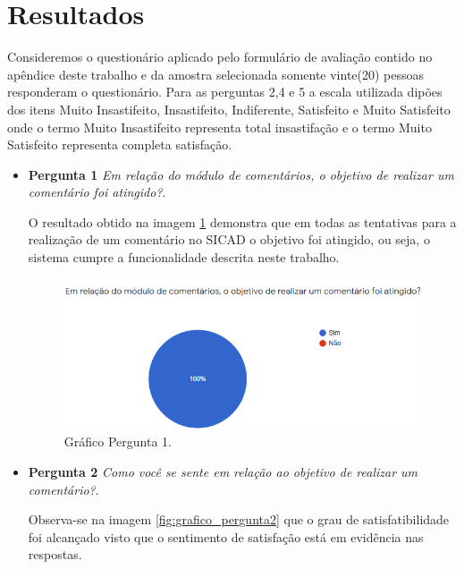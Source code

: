 \documentclass[12pt, a4paper]{report}
\begin{document}
\section{Resultados} 
Consideremos o questionário aplicado pelo formulário de avaliação contido no apêndice deste trabalho e da amostra selecionada somente vinte(20) pessoas responderam o questionário.
Para as perguntas 2,4 e 5 a escala utilizada dipões dos itens Muito Insastifeito, Insastifeito, Indiferente, Satisfeito e Muito Satisfeito onde o termo Muito Insastifeito representa total insastifação e o termo Muito Satisfeito representa completa satisfação.

\begin{itemize}
\item{\textbf{ Pergunta 1}}
\textit{Em relação do módulo de comentários, o objetivo de realizar um comentário foi atingido?}.

O resultado obtido na imagem \ref{fig:grafico_pergunta1} demonstra que em todas as tentativas para a realização de um comentário no SICAD o objetivo foi atingido, ou seja, o sistema cumpre a funcionalidade descrita neste trabalho.

\begin{figure}
\centering
\includegraphics[scale=0.8]{grafico_pergunta1.png}
\caption{Gráfico Pergunta 1.}
\label{fig:grafico_pergunta1}
\end{figure}

\item{\textbf{ Pergunta 2}}
\textit{Como você se sente em relação ao objetivo de realizar um comentário?}.


Observa-se na imagem \ref{fig:grafico_pergunta2} que o grau de satisfatibilidade foi alcançado visto que o sentimento de satisfação está em evidência nas respostas.


\end{itemize}
\end{document}
